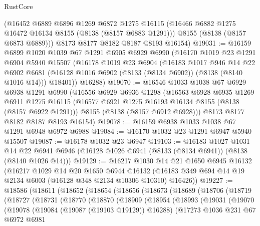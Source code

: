 \begin{lexlean}{RustCore}
\begin{coremodule}
      (@16452
        @6889
        @6896
        @1269
        @6872
        @1275
        @16115
        (@16466 @6882 @1275 @16472 @16134 @8155 (@8138 (@8157 @6883 @1291)))
        @8155
        (@8138 (@8157 @6873 @6889)))
      @8173
      @8177
      @8182
      @8187
      @8193
      @16154)
@19031 := @16159
    @6899
    @1020
    @1039
    @67
    @1291
    @6905
    @6929
    @6990
    (@16170
      @1019
      @23
      @1291
      @6904
      @5940
      @15507
      (@16178
        @1019
        @23
        @6904
        (@16183
          @1017
          @946
          @14
          @22
          @6902
          @6681
          (@16128 @1016 @6902 (@8133 (@8134 @6902)) (@8138 (@8140 @1016 @14)))
          @18401))
      @16288)
@19070 := @16546
    @1033
    @1038
    @67
    @6929
    @6938
    @1291
    @6990
    (@16556
      @6929
      @6936
      @1298
      (@16563
        @6928
        @6935
        @1269
        @6911
        @1275
        @16115
        (@16577 @6921 @1275 @16193 @16134 @8155 (@8138 (@8157 @6922 @1291)))
        @8155
        (@8138 (@8157 @6912 @6928)))
      @8173
      @8177
      @8182
      @8187
      @8193
      @16154)
@19078 := @16159 @6938 @1033 @1038 @67 @1291 @6948 @6972 @6988
@19084 := @16170 @1032 @23 @1291 @6947 @5940 @15507
@19087 := @16178 @1032 @23 @6947
@19103 := @16183
    @1027
    @1031
    @14
    @22
    @6941
    @6946
    (@16128 @1026 @6941 (@8133 (@8134 @6941)) (@8138 (@8140 @1026 @14)))
@19129 := @16217
    @1030
    @14
    @21
    @1650
    @6945
    @16132
    (@16217
      @1029
      @14
      @20
      @1650
      @6944
      @16132
      (@16183 @349 @694 @14 @19 @2134 @6003 (@16128 @348 @2134 @10306 @10310) @16426))
@19227 := @18586
    (@18611
      (@18652
        (@18654
          (@18656
            (@18673
              (@18689
                (@18706
                  (@18719
                    (@18727
                      (@18731
                        (@18770
                          (@18870
                            (@18909
                              (@18954
                                (@18993
                                  (@19031
                                    (@19070
                                      (@19078
                                        (@19084 (@19087 (@19103 @19129)) @16288)
                                        (@17273
                                          @1036
                                          @231
                                          @67
                                          @6972
                                          @6981

\end{coremodule}
\end{lexlean}
